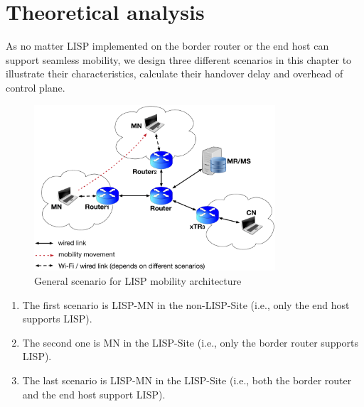 \section{Theoretical analysis}
\label{sec:ns3_analysis}
As no matter LISP implemented on the border router or the end host can support seamless mobility, we design three different scenarios in this chapter to illustrate their characteristics, calculate their handover delay and overhead of control plane. 
\begin{figure}[!th]
	\centering
	\includegraphics[width=0.8\textwidth]{Pics/LISP_mobility_archi}
	\caption{General scenario for LISP mobility architecture}
	\label{sim_archi}
\end{figure}
\begin{enumerate}[noitemsep,topsep=0pt]
	\item The first scenario is LISP-MN in the non-LISP-Site (i.e., only the end host supports LISP). 
	\item The second one is MN in the LISP-Site (i.e., only the border router supports LISP). 
	\item The last scenario is LISP-MN in the LISP-Site (i.e., both the border router and the end host support LISP). 
\end{enumerate}	
